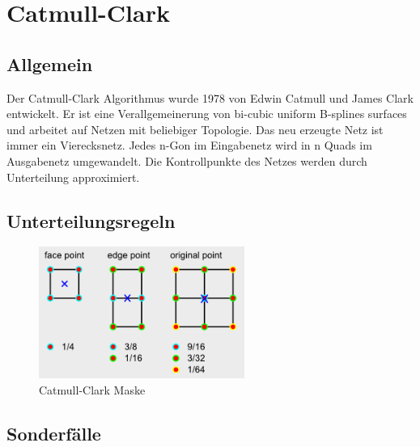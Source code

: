 \section{Catmull-Clark}

\subsection{Allgemein}

Der Catmull-Clark Algorithmus wurde 1978 von Edwin Catmull und James Clark entwickelt.
Er ist eine Verallgemeinerung von bi-cubic uniform B-splines surfaces und arbeitet auf
Netzen mit beliebiger Topologie.
Das neu erzeugte Netz ist immer ein Vierecksnetz. Jedes n-Gon im Eingabenetz wird in n Quads
im Ausgabenetz umgewandelt.
Die Kontrollpunkte des Netzes werden durch Unterteilung approximiert.


\subsection{Unterteilungsregeln}

\begin{figure}
\centering
\includegraphics[width=0.6\textwidth]{content/media/sd_catmull_mask.png}
\caption{Catmull-Clark Maske \cite{yoshihitoyagi.23.12.2015}}
\label{fig:sd_catmull_mask}
\end{figure}

\cite{rosettacode.23.12.2015}
\cite{rorydriscoll.23.12.2015}
\cite{yoshihitoyagi.23.12.2015}



\subsection{Sonderfälle}


